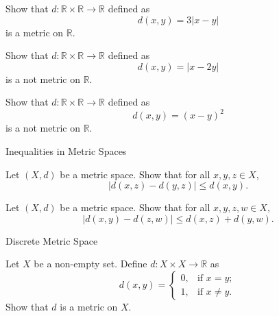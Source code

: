 \documentclass[12pt, a4paper]{article}
\begin{document}
\clearpage

\begin{theorem}
    Show that $d:\mathbb{R}\times\mathbb{R}\to\mathbb{R}$ defined as
    \[
        d(x,y)=3|x-y|
    \]
    is a metric on $\mathbb{R}$.
\end{theorem}

\clearpage

\begin{problem}
    Show that $d:\mathbb{R}\times\mathbb{R}\to\mathbb{R}$ defined as
    \[
        d(x,y)=|x-2y|
    \]
    is a not metric on $\mathbb{R}$.
\end{problem}

\clearpage

\begin{problem}
    Show that $d:\mathbb{R}\times\mathbb{R}\to\mathbb{R}$ defined as
    \[
        d(x,y)=(x-y)^2
    \]
    is a not metric on $\mathbb{R}$.
\end{problem}

\clearpage

\begin{heading}
    Inequalities in Metric Spaces
\end{heading}

\vspace{10pt}

\begin{theorem}
    Let $(X,d)$ be a metric space. Show that for all $x,y,z\in X$,
    \[
        |d(x,z)-d(y,z)|\le d(x,y).
    \]
\end{theorem}

\clearpage

\begin{theorem}
    Let $(X,d)$ be a metric space. Show that for all $x,y,z,w\in X$,
    \[
        |d(x,y)-d(z,w)|\le d(x,z)+d(y,w).
    \]
\end{theorem}

\clearpage

\begin{heading}
    Discrete Metric Space
\end{heading}

\vspace{10pt}

\begin{theorem}
    Let $X$ be a non-empty set. Define $d:X\times X\to\mathbb{R}$ as
    \[
        d(x,y)=\begin{cases}
            0, & \text{if } x=y;\\
            1, & \text{if } x\ne y.
        \end{cases}
    \]
    Show that $d$ is a metric on $X$.
\end{theorem}
\end{document}
